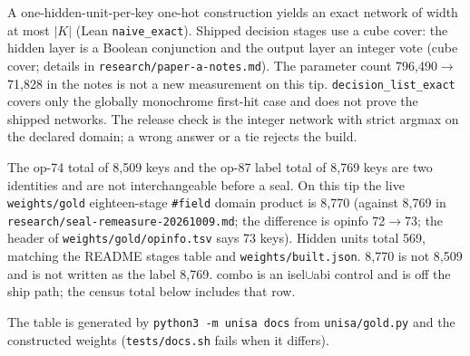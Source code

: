 \documentclass[11pt]{article}
\begin{document}
A one-hidden-unit-per-key one-hot construction yields an exact network of width at most $|K|$ (Lean \texttt{naive\_exact}). Shipped decision stages use a cube cover: the hidden layer is a Boolean conjunction and the output layer an integer vote (cube cover; details in \texttt{research/paper-a-notes.md}). The parameter count 796,490$\to$71,828 in the notes is not a new measurement on this tip. \texttt{decision\_list\_exact} covers only the globally monochrome first-hit case and does not prove the shipped networks. The release check is the integer network with strict argmax on the declared domain; a wrong answer or a tie rejects the build.

The op-74 total of 8,509 keys and the op-87 label total of 8,769 keys are two identities and are not interchangeable before a seal. On this tip the live \texttt{weights/gold} eighteen-stage \texttt{\#field} domain product is 8,770 (against 8,769 in \texttt{research/seal-remeasure-20261009.md}; the difference is opinfo 72$\to$73; the header of \texttt{weights/gold/opinfo.tsv} says 73 keys). Hidden units total 569, matching the README stages table and \texttt{weights/built.json}. 8,770 is not 8,509 and is not written as the label 8,769. combo is an isel$\cup$abi control and is off the ship path; the census total below includes that row.

The table is generated by \texttt{python3 -m unisa docs} from \texttt{unisa/gold.py} and the constructed weights (\texttt{tests/docs.sh} fails when it differs).
\end{document}

